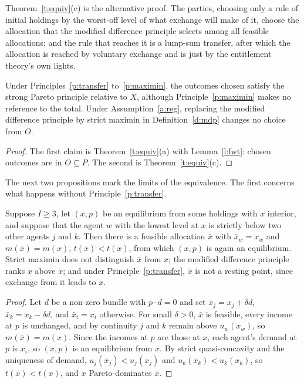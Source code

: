 \documentclass{situationist-preprint}
\begin{document}
Theorem~\ref{t:equiv}(c) is the alternative proof. The parties, choosing only a rule of initial holdings by the worst-off level of what exchange will make of it, choose the allocation that the modified difference principle selects among all feasible allocations; and the rule that reaches it is a lump-sum transfer, after which the allocation is reached by voluntary exchange and is just by the entitlement theory's own lights.

\begin{corollary}\label{c:redundant}
Under Principles~\ref{p:transfer} to~\ref{p:maximin}, the outcomes chosen satisfy the strong Pareto principle relative to $X$, although Principle~\ref{p:maximin} makes no reference to the total. Under Assumption~\ref{a:reg}, replacing the modified difference principle by strict maximin in Definition~\ref{d:mdp} changes no choice from $O$.
\end{corollary}

\begin{proof}
The first claim is Theorem~\ref{t:equiv}(a) with Lemma~\ref{l:fwt}: chosen outcomes are in $O \subseteq P$. The second is Theorem~\ref{t:equiv}(c).
\end{proof}

The next two propositions mark the limits of the equivalence. The first concerns what happens without Principle~\ref{p:transfer}.

\begin{proposition}\label{p:wilt}
Suppose $I \geq 3$, let $(x, p)$ be an equilibrium from some holdings with $x$ interior, and suppose that the agent $w$ with the lowest level at $x$ is strictly below two other agents $j$ and $k$. Then there is a feasible allocation $\bar{x}$ with $\bar{x}_w = x_w$ and $m(\bar{x}) = m(x)$, $t(\bar{x}) < t(x)$, from which $(x, p)$ is again an equilibrium. Strict maximin does not distinguish $\bar{x}$ from $x$; the modified difference principle ranks $x$ above $\bar{x}$; and under Principle~\ref{p:transfer}, $\bar{x}$ is not a resting point, since exchange from it leads to $x$.
\end{proposition}

\begin{proof}
Let $d$ be a non-zero bundle with $p \cdot d = 0$ and set $\bar{x}_j = x_j + \delta d$, $\bar{x}_k = x_k - \delta d$, and $\bar{x}_i = x_i$ otherwise. For small $\delta > 0$, $\bar{x}$ is feasible, every income at $p$ is unchanged, and by continuity $j$ and $k$ remain above $u_w(x_w)$, so $m(\bar{x}) = m(x)$. Since the incomes at $p$ are those at $x$, each agent's demand at $p$ is $x_i$, so $(x, p)$ is an equilibrium from $\bar{x}$. By strict quasi-concavity and the uniqueness of demand, $u_j(\bar{x}_j) < u_j(x_j)$ and $u_k(\bar{x}_k) < u_k(x_k)$, so $t(\bar{x}) < t(x)$, and $x$ Pareto-dominates $\bar{x}$.
\end{proof}
\end{document}
